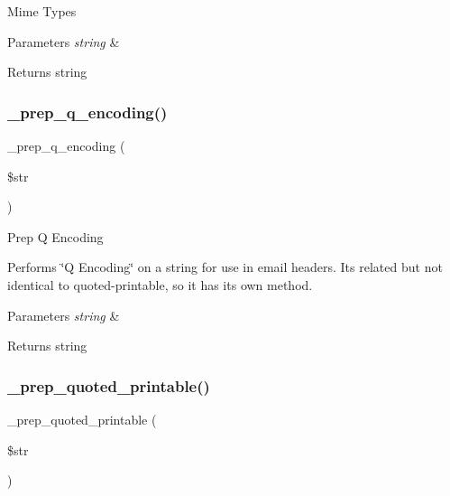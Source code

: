 Mime Types


\begin{DoxyParams}{Parameters}
{\em string} & \\
\hline
\end{DoxyParams}
\begin{DoxyReturn}{Returns}
string 
\end{DoxyReturn}
\mbox{\label{class_c_i___email_a56a4d842c3dfe77bcb41082a82c5df24}} 
\subsubsection{\texorpdfstring{\+\_\+prep\+\_\+q\+\_\+encoding()}{\_prep\_q\_encoding()}}
{\footnotesize\ttfamily \+\_\+prep\+\_\+q\+\_\+encoding (\begin{DoxyParamCaption}\item[{}]{\$str }\end{DoxyParamCaption})\hspace{0.3cm}{\ttfamily [protected]}}

Prep Q Encoding

Performs \char`\"{}\+Q Encoding\char`\"{} on a string for use in email headers. It\textquotesingle{}s related but not identical to quoted-\/printable, so it has its own method.


\begin{DoxyParams}{Parameters}
{\em string} & \\
\hline
\end{DoxyParams}
\begin{DoxyReturn}{Returns}
string 
\end{DoxyReturn}
\mbox{\label{class_c_i___email_af2beda05a0ab5d0ec65b03da633b1d33}} 
\subsubsection{\texorpdfstring{\+\_\+prep\+\_\+quoted\+\_\+printable()}{\_prep\_quoted\_printable()}}
{\footnotesize\ttfamily \+\_\+prep\+\_\+quoted\+\_\+printable (\begin{DoxyParamCaption}\item[{}]{\$str }\end{DoxyParamCaption})\hspace{0.3cm}{\ttfamily [protected]}}

